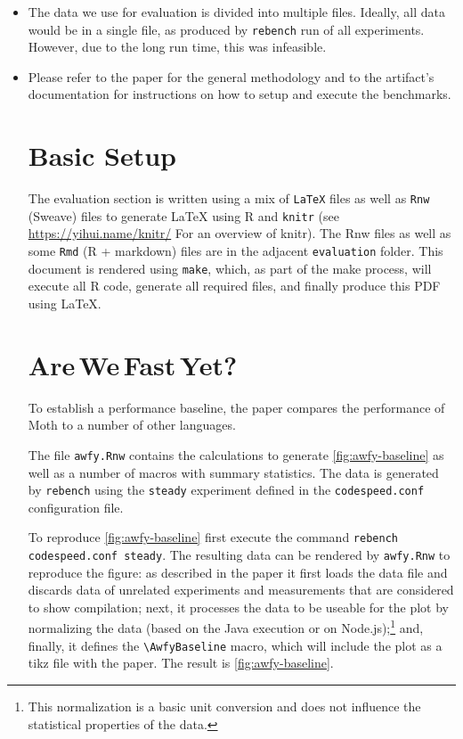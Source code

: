 \documentclass[a4paper,USenglish]{darts-v2019}
\def\AWFY{Are\,We\,Fast\,Yet\xspace}
\newcommand{\code}[1]{\texttt{#1}}
\begin{document}
\begin{itemize}

\item The data we use for evaluation is divided into multiple files.
Ideally, all data would be in a single file, 
as produced by \code{rebench} run of all experiments.
However, due to the long run time, this was infeasible.

\item Please refer to the paper for the general methodology and 
to the artifact's documentation for instructions on how
to setup and execute the benchmarks.

\section{Basic Setup}

The evaluation section is written using a mix of \code{LaTeX} files
as well as \code{Rnw} (Sweave) files to generate LaTeX using R and \code{knitr}
(see \url{https://yihui.name/knitr/} For an overview of knitr).
%
The Rnw files as well as some \code{Rmd} (R + markdown) files are in the
adjacent \code{evaluation} folder.
%
This document is rendered using \code{make},
which, as part of the make process,
will execute all R code, generate all required files,
and finally produce this PDF using LaTeX.

\section{\AWFY?}
\label{sec:baseline-perf}

To establish a performance baseline,
the paper compares the performance of Moth
to a number of other languages.

The file \code{awfy.Rnw} contains the calculations to generate
\cref{fig:awfy-baseline} as well as a number of macros with summary statistics.
The data is generated by \code{rebench} using the \code{steady} experiment
defined in the \code{codespeed.conf} configuration file.

To reproduce \cref{fig:awfy-baseline}
first execute the command \code{rebench codespeed.conf steady}.
The resulting data can be rendered by \code{awfy.Rnw} to reproduce the figure:
as described in the paper
it first loads the data file
and discards data of unrelated experiments
and measurements that are considered to show compilation;
next, it processes the data to be useable for the plot
by normalizing the data (based on the Java execution or on Node.js);\footnote{
This normalization is a basic unit conversion and does not influence the
statistical properties of the data.
}
and, finally, it defines the \code{\textbackslash{}AwfyBaseline} macro,
which will include the plot as a tikz file with the paper.
The result is \cref{fig:awfy-baseline}.


\end{itemize}
\end{document}
